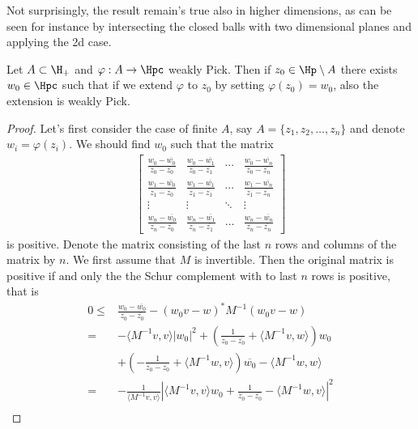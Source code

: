 Not surprisingly, the result remain's true also in higher dimensions, as can be seen for instance by intersecting the closed balls with two dimensional planes and applying the 2d case.

\begin{lem}\label{pick_extension_lemma}
	Let $A \subset \H_{+}$ and $\varphi : A \to \Hpc$ weakly Pick. Then if $z_{0} \in \Hp \setminus A$ there exists $w_{0} \in \Hpc$ such that if we extend $\varphi$ to $z_{0}$ by setting $\varphi(z_{0}) = w_{0}$, also the extension is weakly Pick.
\end{lem}
\begin{proof}
	Let's first consider the case of finite $A$, say $A = \{z_{1}, z_{2}, \ldots, z_{n}\}$ and denote $w_{i} = \varphi(z_{i})$. We should find $w_{0}$ such that the matrix
	\begin{align*}
		\begin{bmatrix}
			\frac{w_{0} - \overline{w_{0}}}{z_{0} - \overline{z_{0}}} & \frac{w_{0} - \overline{w_{1}}}{z_{0} - \overline{z_{1}}} & \cdots & \frac{w_{0} - \overline{w_{n}}}{z_{0} - \overline{z_{n}}} \\
			\frac{w_{1} - \overline{w_{0}}}{z_{1} - \overline{z_{0}}} & \frac{w_{1} - \overline{w_{1}}}{z_{1} - \overline{z_{1}}} & \cdots & \frac{w_{1} - \overline{w_{n}}}{z_{1} - \overline{z_{n}}} \\
			\vdots & \vdots & \ddots & \vdots \\
			\frac{w_{n} - \overline{w_{0}}}{z_{n} - \overline{z_{0}}} & \frac{w_{n} - \overline{w_{1}}}{z_{n} - \overline{z_{1}}} & \ldots & \frac{w_{n} - \overline{w_{n}}}{z_{n} - \overline{z_{n}}}
		\end{bmatrix}
	\end{align*}
	is positive. Denote the matrix consisting of the last $n$ rows and columns of the matrix by $n$. We first assume that $M$ is invertible. Then the original matrix is positive if and only the the Schur complement with to last $n$ rows is positive, that is
	\begin{align*}
		0 \leq &\frac{w_{0} - \overline{w_{0}}}{z_{0} - \overline{z_{0}}} - (w_{0} v - w)^{*} M^{-1} (w_{0} v - w) \\
		=& -\langle M^{-1} v, v \rangle |w_{0}|^2 + \left(\frac{1}{z_{0} - \overline{z_{0}}} + \langle M^{-1} v, w \rangle \right) w_{0} \\
		&+  \left(-\frac{1}{z_{0} - \overline{z_{0}}} + \langle M^{-1} w, v \rangle \right) \overline{w_{0}} - \langle M^{-1} w, w \rangle \\
		=&  -\frac{1}{\langle M^{-1} v, v \rangle} \left|\langle M^{-1} v, v \rangle w_{0} +  \frac{1}{z_{0} - \overline{z_{0}}} - \langle M^{-1} w, v \rangle\right|^{2} \\

\end{align*}
\end{proof}
